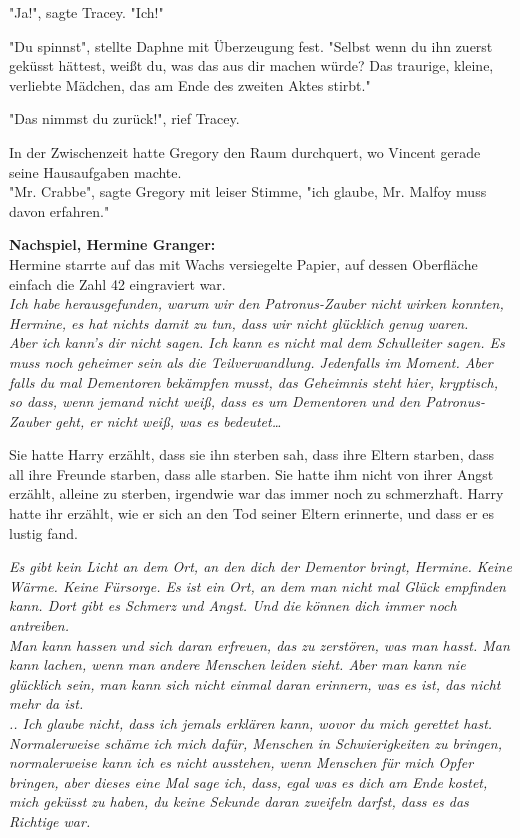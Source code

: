 {"Ja!", sagte Tracey. "Ich!"

"Du spinnst", stellte Daphne mit Überzeugung fest. "Selbst wenn du ihn zuerst geküsst hättest, weißt du, was das aus dir machen würde? Das traurige, kleine, verliebte Mädchen, das am Ende des zweiten Aktes stirbt."

"Das nimmst du zurück!", rief Tracey.

In der Zwischenzeit hatte Gregory den Raum durchquert, wo Vincent gerade seine Hausaufgaben machte.\\ "Mr. Crabbe", sagte Gregory mit leiser Stimme, "ich glaube, Mr. Malfoy muss davon erfahren."

\textbf{Nachspiel, Hermine Granger:}\\ Hermine starrte auf das mit Wachs versiegelte Papier, auf dessen Oberfläche einfach die Zahl 42 eingraviert war.\\

\emph{Ich habe herausgefunden, warum wir den Patronus-Zauber nicht wirken konnten, Hermine, es hat nichts damit zu tun, dass wir nicht glücklich genug waren.\\ Aber ich kann's dir nicht sagen. Ich kann es nicht mal dem Schulleiter sagen. Es muss noch geheimer sein als die Teilverwandlung. Jedenfalls im Moment. Aber falls du mal Dementoren bekämpfen musst, das Geheimnis steht hier, kryptisch, so dass, wenn jemand nicht weiß, dass es um Dementoren und den Patronus-Zauber geht, er nicht weiß, was es bedeutet…}

Sie hatte Harry erzählt, dass sie ihn sterben sah, dass ihre Eltern starben, dass all ihre Freunde starben, dass alle starben. Sie hatte ihm nicht von ihrer Angst erzählt, alleine zu sterben, irgendwie war das immer noch zu schmerzhaft. Harry hatte ihr erzählt, wie er sich an den Tod seiner Eltern erinnerte, und dass er es lustig fand.

\emph{Es gibt kein Licht an dem Ort, an den dich der Dementor bringt, Hermine. Keine Wärme. Keine Fürsorge. Es ist ein Ort, an dem man nicht mal Glück empfinden kann. Dort gibt es Schmerz und Angst. Und die können dich immer noch antreiben.\\ Man kann hassen und sich daran erfreuen, das zu zerstören, was man hasst. Man kann lachen, wenn man andere Menschen leiden sieht. Aber man kann nie glücklich sein, man kann sich nicht einmal daran erinnern, was es ist, das nicht mehr da ist.\\ .. Ich glaube nicht, dass ich jemals erklären kann, wovor du mich gerettet hast. Normalerweise schäme ich mich dafür, Menschen in Schwierigkeiten zu bringen, normalerweise kann ich es nicht ausstehen, wenn Menschen für mich Opfer bringen, aber dieses eine Mal sage ich, dass, egal was es dich am Ende kostet, mich geküsst zu haben, du keine Sekunde daran zweifeln darfst, dass es das Richtige war.}

}
